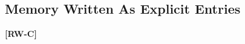\documentclass[letterpaper, 10 pt, conference]{ieeeconf}
\newcommand{\todo}[1]{\textbf{[#1]}}
\begin{document}
\subsection{Memory Written As Explicit Entries}
\todo{RW-C}
\end{document}
